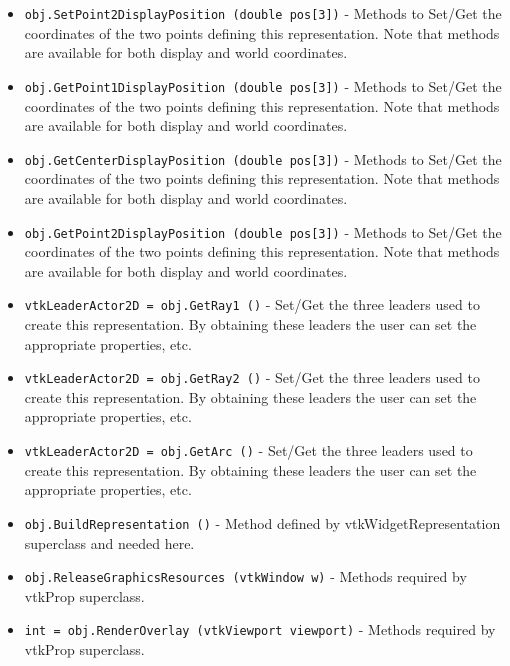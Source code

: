 \begin{itemize}
\item  \verb|obj.SetPoint2DisplayPosition (double pos[3])| -  Methods to Set/Get the coordinates of the two points defining
 this representation. Note that methods are available for both
 display and world coordinates.

\item  \verb|obj.GetPoint1DisplayPosition (double pos[3])| -  Methods to Set/Get the coordinates of the two points defining
 this representation. Note that methods are available for both
 display and world coordinates.

\item  \verb|obj.GetCenterDisplayPosition (double pos[3])| -  Methods to Set/Get the coordinates of the two points defining
 this representation. Note that methods are available for both
 display and world coordinates.

\item  \verb|obj.GetPoint2DisplayPosition (double pos[3])| -  Methods to Set/Get the coordinates of the two points defining
 this representation. Note that methods are available for both
 display and world coordinates.

\item  \verb|vtkLeaderActor2D = obj.GetRay1 ()| -  Set/Get the three leaders used to create this representation.
 By obtaining these leaders the user can set the appropriate
 properties, etc.

\item  \verb|vtkLeaderActor2D = obj.GetRay2 ()| -  Set/Get the three leaders used to create this representation.
 By obtaining these leaders the user can set the appropriate
 properties, etc.

\item  \verb|vtkLeaderActor2D = obj.GetArc ()| -  Set/Get the three leaders used to create this representation.
 By obtaining these leaders the user can set the appropriate
 properties, etc.

\item  \verb|obj.BuildRepresentation ()| -  Method defined by vtkWidgetRepresentation superclass and
 needed here.

\item  \verb|obj.ReleaseGraphicsResources (vtkWindow w)| -  Methods required by vtkProp superclass.

\item  \verb|int = obj.RenderOverlay (vtkViewport viewport)| -  Methods required by vtkProp superclass.

\end{itemize}
